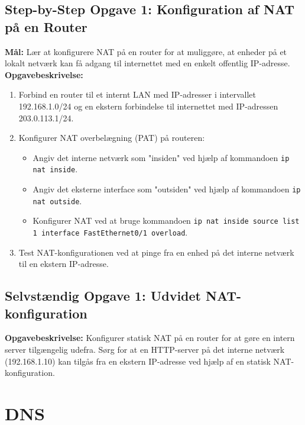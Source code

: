 \subsection*{Step-by-Step Opgave 1: Konfiguration af NAT på en Router}
\textbf{Mål:} Lær at konfigurere NAT på en router for at muliggøre, at enheder på et lokalt netværk kan få adgang til internettet med en enkelt offentlig IP-adresse.
\newline\newline\noindent
\textbf{Opgavebeskrivelse:}
\begin{enumerate}
	\item Forbind en router til et internt LAN med IP-adresser i intervallet 192.168.1.0/24 og en ekstern forbindelse til internettet med IP-adressen 203.0.113.1/24.
	\item Konfigurer NAT overbelægning (PAT) på routeren:
	\begin{itemize}
		\item Angiv det interne netværk som "insiden" ved hjælp af kommandoen \texttt{ip nat inside}.
		\item Angiv det eksterne interface som "outsiden" ved hjælp af kommandoen \texttt{ip nat outside}.
		\item Konfigurer NAT ved at bruge kommandoen \texttt{ip nat inside source list 1 interface FastEthernet0/1 overload}.
	\end{itemize}
	\item Test NAT-konfigurationen ved at pinge fra en enhed på det interne netværk til en ekstern IP-adresse.
\end{enumerate}

\subsection*{Selvstændig Opgave 1: Udvidet NAT-konfiguration}
\textbf{Opgavebeskrivelse:} Konfigurer statisk NAT på en router for at gøre en intern server tilgængelig udefra. Sørg for at en HTTP-server på det interne netværk (192.168.1.10) kan tilgås fra en ekstern IP-adresse ved hjælp af en statisk NAT-konfiguration.


\section{DNS}
